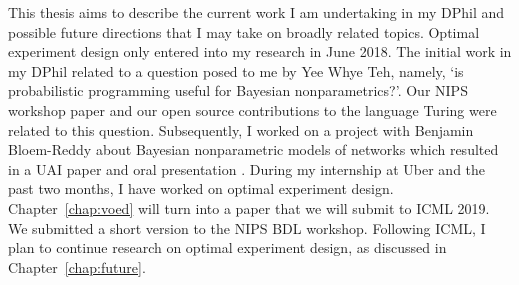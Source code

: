This thesis aims to describe the current work I am undertaking in my DPhil and possible future directions that I may take on broadly related topics. Optimal experiment design only entered into my research in June 2018. The initial work in my DPhil related to a question posed to me by Yee Whye Teh, namely, `is probabilistic programming useful for Bayesian nonparametrics?'. Our NIPS workshop paper \cite{bnpppl} and our open source contributions to the language Turing were related to this question. Subsequently, I worked on a project with Benjamin Bloem-Reddy about Bayesian nonparametric models of networks which resulted in a UAI paper and oral presentation \cite{bntl}. During my internship at Uber and the past two months, I have worked on optimal experiment design. Chapter~\ref{chap:voed} will turn into a paper that we will submit to ICML 2019. We submitted a short version to the NIPS BDL workshop. Following ICML, I plan to continue research on optimal experiment design, as discussed in Chapter~\ref{chap:future}.